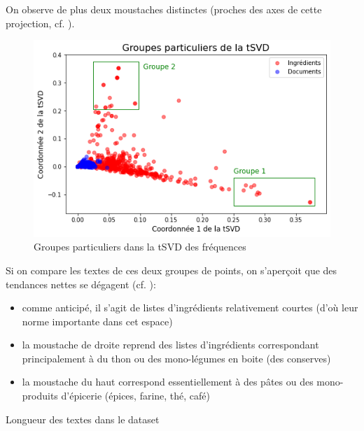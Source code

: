             On observe de plus deux \og moustaches \fg distinctes (proches des axes de cette projection, cf. ).
            \begin{figure}[htbp]
                \begin{center}
                \includegraphics[width=0.9\linewidth]{img/tSVD_freq_groups.png}
                \end{center}
                \caption{Groupes particuliers dans la tSVD des fréquences}
                \label{fig:tSVD_freq_groups}
            \end{figure}    
            Si on compare les textes de ces deux groupes de points, on s'aperçoit que des tendances nettes se dégagent (cf. ):
            \begin{itemize}
                \item comme anticipé, il s'agit de listes d'ingrédients relativement courtes (d'où leur norme importante dans cet espace)
                \item la moustache de droite reprend des listes d'ingrédients correspondant principalement à du thon ou des mono-légumes en boite (des conserves)
                \item la moustache du haut correspond essentiellement à des pâtes ou des mono-produits d'épicerie (épices, farine, thé, café)        
            \end{itemize}           
            {\renewcommand{\arraystretch}{1.5}%
            \begin{table}[htbp]
                \begin{center}
                {\scriptsize
                
                }
                \caption{Longueur des textes dans le dataset}
                \label{tbl:tSVD_sample}
                \end{center}
            \end{table}
            }

            